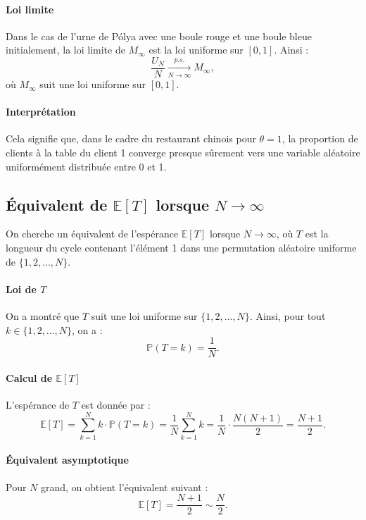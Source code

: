 \documentclass[12pt, a4paper]{article}
\theoremstyle{definition}
\theoremstyle{plain}
\begin{document}
\paragraph{Loi limite}
Dans le cas de l'urne de Pólya avec une boule rouge et une boule bleue initialement, la loi limite de \( M_\infty \) est la loi uniforme sur \([0,1]\). Ainsi :
\[
\frac{U_N}{N} \xrightarrow[N \to \infty]{p.s.} M_\infty,
\]
où \( M_\infty \) suit une loi uniforme sur \([0,1]\).

\paragraph{Interprétation}
Cela signifie que, dans le cadre du restaurant chinois pour \(\theta = 1\), la proportion de clients à la table du client 1 converge presque sûrement vers une variable aléatoire uniformément distribuée entre 0 et 1.

\subsection{Équivalent de \(\mathbb{E}[T]\) lorsque \(N \to \infty\)}

On cherche un équivalent de l'espérance \(\mathbb{E}[T]\) lorsque \(N \to \infty\), où \(T\) est la longueur du cycle contenant l'élément 1 dans une permutation aléatoire uniforme de \(\{1, 2, \dots, N\}\).

\paragraph{Loi de \(T\)}
On a montré que \(T\) suit une loi uniforme sur \(\{1, 2, \dots, N\}\). Ainsi, pour tout \(k \in \{1, 2, \dots, N\}\), on a :
\[
\mathbb{P}(T = k) = \frac{1}{N}.
\]

\paragraph{Calcul de \(\mathbb{E}[T]\)}
L'espérance de \(T\) est donnée par :
\[
\mathbb{E}[T] = \sum_{k=1}^N k \cdot \mathbb{P}(T = k) = \frac{1}{N} \sum_{k=1}^N k = \frac{1}{N} \cdot \frac{N(N+1)}{2} = \frac{N+1}{2}.
\]

\paragraph{Équivalent asymptotique}
Pour \(N\) grand, on obtient l'équivalent suivant :
\[
\mathbb{E}[T] = \frac{N+1}{2} \sim \frac{N}{2}.
\]
\end{document}
